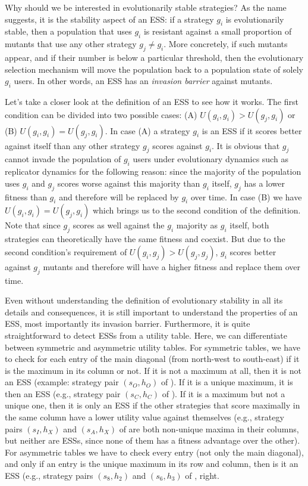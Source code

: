 \documentclass[output=paper,hidelinks]{langscibook}
\begin{document}
Why should we be interested in evolutionarily stable strategies? As the name suggests, it is the stability aspect of an ESS: if a strategy $g_i$ is evolutionarily stable, then a population that uses $g_i$ is resistant against  a small proportion of mutants that use any other strategy $g_j \neq g_i$. More concretely, if such mutants appear, and if their number is below a particular threshold, then the evolutionary selection mechanism will move the population back to a population state of solely $g_i$ users. In other words, an ESS has an  \emph{invasion barrier} against mutants.

Let's take a closer look at the definition of an ESS to see how it works. The first condition can be divided into two possible cases: (A) $U(g_i,g_i) > U(g_j,g_i)$ or (B) $U(g_i,g_i) = U(g_j,g_i)$. In case (A) a strategy $g_i$ is an ESS if it scores better against itself than any other strategy $g_j$ scores against $g_i$. It is obvious that $g_j$ cannot invade the population of $g_i$ users under evolutionary dynamics such as replicator dynamics for the following reason: since the majority of the population uses $g_i$ and $g_j$ scores worse against this majority than $g_i$ itself, $g_j$ has a lower fitness than $g_i$ and therefore will be replaced by $g_i$ over time. In case (B) we have $U(g_i,g_i) = U(g_j,g_i)$ which brings us to the second condition of the definition. Note that since $g_j$ scores as well against the $g_i$ majority as $g_i$ itself, both strategies can theoretically have the same fitness and coexist. But due to the second condition's requirement of 
$U(g_i,g_j) > U(g_j,g_j)$, $g_i$ scores better against $g_j$ mutants and therefore will have a higher fitness and replace them over time.

Even without understanding the definition of evolutionary stability in all its details and consequences, it is still important to understand the properties of an ESS, most importantly its invasion barrier. Furthermore, it is quite straightforward to detect ESSs from a utility table. Here, we can differentiate between symmetric and asymmetric utility tables. For symmetric tables, we have to check for each entry of the main diagonal (from north-west to south-east) if it is the maximum in its column or not. If it is not a maximum at all, then it is not an ESS (example: strategy pair $(s_O,h_O)$ of ). If it is a unique maximum, it is then an ESS (e.g., strategy pair $(s_C,h_C)$ of ). If it is a maximum but not a unique one, then it is only an ESS if the other strategies that score maximally in the same column have a lower utility value against themselves  (e.g., strategy pairs $(s_I,h_X)$ and  $(s_A,h_X)$ of  are both non-unique maxima in their columns, but neither are ESSs, since none of them has a fitness advantage over the other). For asymmetric  tables we have to check every entry (not only the main diagonal), and only if an entry is the unique maximum in its row and column, then is it an ESS (e.g., strategy pairs $(s_8,h_2)$ and $(s_6,h_3)$ of , right.
\end{document}

